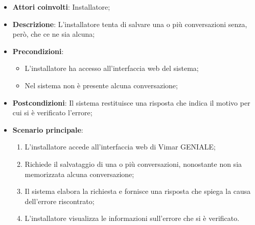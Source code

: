 \begin{itemize}
    \item \textbf{Attori coinvolti}: Installatore;
    \item \textbf{Descrizione}: L’installatore tenta di salvare una o più conversazioni senza, però, che ce ne sia alcuna;
    \item \textbf{Precondizioni}: 
        \begin{itemize}
            \item L’installatore ha accesso all’interfaccia web del sistema;
            \item Nel sistema non è presente alcuna conversazione;
        \end{itemize}
    \item \textbf{Postcondizioni}: Il sistema restituisce una risposta che indica il motivo per cui si è verificato l’errore;
    \item \textbf{Scenario principale}:
    \begin{enumerate}
    \item L’installatore accede all’interfaccia web di Vimar GENIALE;
    \item Richiede il salvataggio di una o più conversazioni, nonostante non sia memorizzata alcuna conversazione;
    \item Il sistema elabora la richiesta e fornisce una risposta che spiega la causa dell'errore riscontrato;
    \item L’installatore visualizza le informazioni sull’errore che si è verificato.
    \end{enumerate}
\end{itemize}

